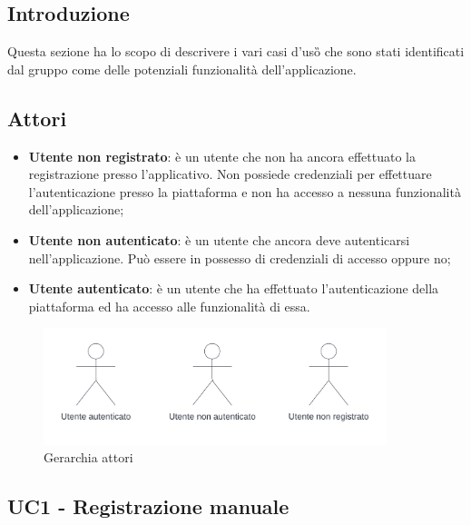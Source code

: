 \subsection{Introduzione}
Questa sezione ha lo scopo di descrivere i vari casi d'uso\G{} che sono stati identificati dal gruppo \teamname{} come delle potenziali funzionalità dell'applicazione.

\subsection{Attori}
\begin{itemize}
    \item \textbf{Utente non registrato}: 
    è un utente che non ha ancora effettuato la registrazione presso l'applicativo.
    Non possiede credenziali per effettuare l'autenticazione presso la piattaforma e non ha accesso a nessuna funzionalità dell'applicazione;
    \item \textbf{Utente non autenticato}: 
    è un utente che ancora deve autenticarsi nell'applicazione. Può essere in possesso di credenziali di accesso oppure no;
    \item \textbf{Utente autenticato}:
    è un utente che ha effettuato l'autenticazione della piattaforma ed ha accesso alle funzionalità di essa.
\end{itemize}

\begin{figure}[!h]
    \includegraphics[width=10cm]{sezioni/Images/Actors.png}
    \centering
    \caption{Gerarchia attori}
\end{figure}
\newpage
    
\subsection{UC1 - Registrazione manuale}

